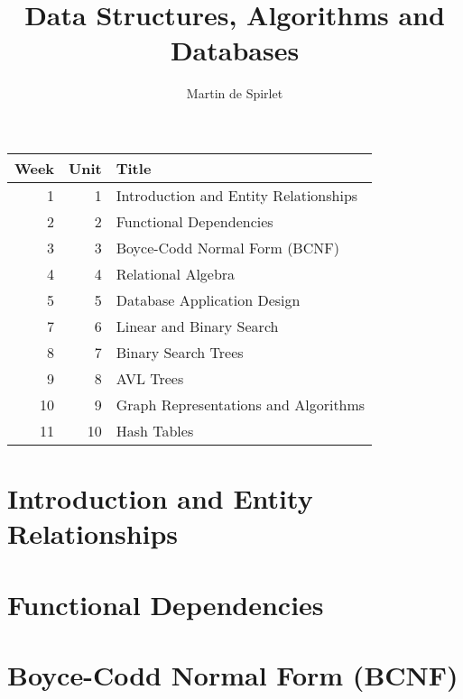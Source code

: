 \documentclass[
  11pt,
  a4paper,
]{article}
\title{Data Structures, Algorithms and Databases}
\author{Martin de Spirlet}
\date{}
\begin{document}

\maketitle

\vspace*{\fill}

\begin{table}[htp]
  \centering
  \begin{tabular}{rrl}
    \toprule
    Week & Unit & Title \\
    \midrule
     1 &  1 & Introduction and Entity Relationships \\
     2 &  2 & Functional Dependencies \\
     3 &  3 & Boyce-Codd Normal Form (BCNF) \\
     4 &  4 & Relational Algebra \\
     5 &  5 & Database Application Design \\
     7 &  6 & Linear and Binary Search \\
     8 &  7 & Binary Search Trees \\
     9 &  8 & AVL Trees \\
    10 &  9 & Graph Representations and Algorithms \\
    11 & 10 & Hash Tables \\
    \bottomrule
  \end{tabular}
\end{table}

\vspace*{\fill}
\addvspace{1in}

\clearpage


\section{Introduction and Entity Relationships}


\section{Functional Dependencies}


\section{Boyce-Codd Normal Form (BCNF)}

\end{document}

